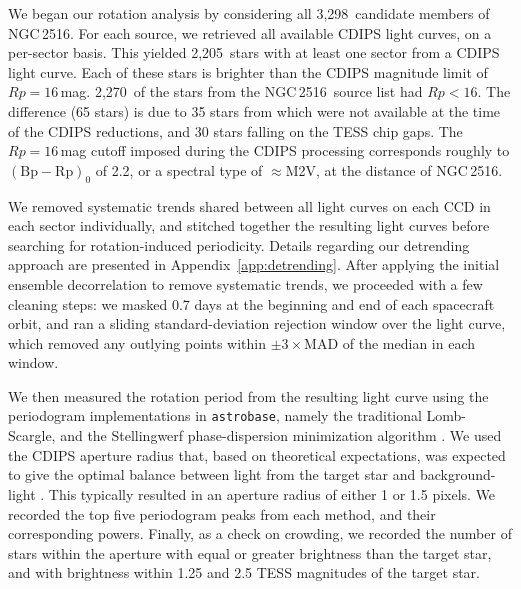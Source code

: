 \documentclass[12pt,twocolumn,tighten]{aastex63}
\newcommand{\cn}{NGC\,2516} %
\newcommand{\nkinematic}{3{,}298} %
\newcommand{\ncdips}{2{,}205}
\newcommand{\nkinematicrpltsixteen}{2{,}270}
\newcommand{\bpmrp}{(\mathrm{Bp}-\mathrm{Rp})_0}
\begin{document}
We began our rotation analysis by considering all \nkinematic\
candidate members of \cn.  For each source, we retrieved all available
CDIPS light curves, on a per-sector basis.  This yielded \ncdips\
stars with at least one sector from a CDIPS light curve.  Each of
these stars is brighter than the CDIPS magnitude limit of
$Rp=16$\,mag.  \nkinematicrpltsixteen\ of the stars from the \cn\
source list had $Rp<16$.  The difference (65 stars) is due to 35 stars
from \citet{meingast_2021} which were not available at the time of the
CDIPS reductions, and 30 stars falling on the TESS chip gaps.  The
$Rp=16$\,mag cutoff imposed during the CDIPS processing corresponds
roughly to $\bpmrp$ of 2.2, or a spectral type of $\approx$M2V, at the
distance of \cn.

We removed systematic trends shared between all light curves on each
CCD in each sector individually, and stitched together the resulting
light curves before searching for rotation-induced periodicity.
Details regarding our detrending approach are presented in
Appendix~\ref{app:detrending}.  After applying the initial ensemble
decorrelation to remove systematic trends, we proceeded with a few
cleaning steps: we masked 0.7 days at the beginning and end of each
spacecraft orbit, and ran a sliding standard-deviation rejection
window over the light curve, which removed any outlying points within
$\pm3\times$MAD of the median in each window.

We then measured the rotation period from the resulting light curve
using the periodogram implementations in \texttt{astrobase}, namely
the traditional Lomb-Scargle, and the Stellingwerf phase-dispersion
minimization algorithm
\citep{lomb_1976,stellingwerf_period_1978,scargle_studies_1982,stellingwerf_period_2011,bhatti_astrobase_2018}.
We used the CDIPS aperture radius that, based on theoretical
expectations, was expected to give the optimal balance between light
from the target star and background-light \citep{Sullivan_2015}.  This
typically resulted in an aperture radius of either 1 or 1.5 pixels.
We recorded the top five periodogram peaks from each method, and their
corresponding powers.  Finally, as a check on crowding, we recorded
the number of stars within the aperture with equal or greater
brightness than the target star, and with brightness within 1.25 and
2.5 TESS magnitudes of the target star.
\end{document}
